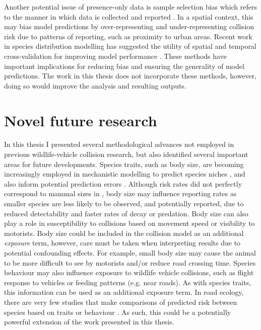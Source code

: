 Another potential issue of presence-only data is sample selection bias which refers to the manner in which data is collected and reported \citep{phil09}. In a spatial context, this may bias model predictions by over-representing and under-representing collision risk due to patterns of reporting, such as proximity to urban areas. Recent work in species distribution modelling has suggested the utility of spatial and temporal cross-validation for improving model performance \citep{weng12,robe17}. These methods have important implications for reducing bias and ensuring the generality of model predictions. The work in this thesis does not incorporate these methods, however, doing so would improve the analysis and resulting outputs.

\section{Novel future research}

In this thesis I presented several methodological advances not employed in previous wildlife-vehicle collision research, but also identified several important areas for future developments. Species traits, such as body size, are becoming increasingly employed in mechanistic modelling to predict species niches \citep{kear09}, and also  inform potential prediction errors \citep[e.g.][]{seoa05}. Although risk rates did not perfectly correspond to mammal sizes in , body size may influence reporting rates as smaller species are less likely to be observed, and potentially reported, due to reduced detectability and faster rates of decay or predation. Body size can also play a role in susceptibility to collisions based on movement speed \citep{jaar06} or visibility to motorists. Body size could be included in the collision model as an additional \textit{exposure} term, however, care must be taken when interpreting results due to potential confounding effects. For example, small body size may cause the animal to be more difficult to see by motorists and/or reduce road crossing time. Species behaviour may also influence exposure to wildlife vehicle collisions, such as flight response to vehicles \citep{deva14,lee10} or feeding patterns (e.g. near roads). As with species traits, this information can be used as an additional exposure term. In road ecology, there are very few studies that make comparisons of predicted risk between species based on traits or behaviour \citep[but see][]{litv08}. As such, this could be a potentially powerful extension of the work presented in this thesis. 

